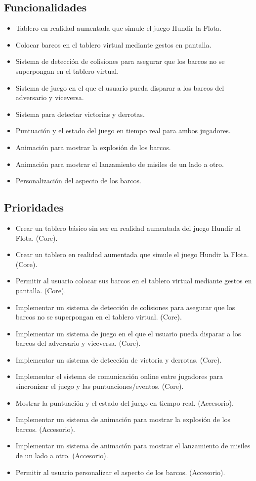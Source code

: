 \documentclass[a4paper, openright, 12pt]{article}
\begin{document}
\subsection{Funcionalidades}
\begin{itemize}
    \item Tablero en realidad aumentada que simule el juego Hundir la Flota.
    \item Colocar barcos en el tablero virtual mediante gestos en pantalla.
    \item Sistema de detección de colisiones para asegurar que los barcos no se superpongan en el tablero virtual.
    \item Sistema de juego en el que el usuario pueda disparar a los barcos del adversario y viceversa.
    \item Sistema para detectar victorias y derrotas.
    \item Puntuación y el estado del juego en tiempo real para ambos jugadores.
    \item Animación para mostrar la explosión de los barcos.
    \item Animación para mostrar el lanzamiento de misiles de un lado a otro.
    \item Personalización del aspecto de los barcos.
\end{itemize}
\subsection{Prioridades}
\begin{itemize}
    \item Crear un tablero básico sin ser en realidad aumentada del juego Hundir al Flota. (Core).
    \item Crear un tablero en realidad aumentada que simule el juego Hundir la Flota. (Core).
    \item Permitir al usuario colocar sus barcos en el tablero virtual mediante gestos en pantalla. (Core).
    \item Implementar un sistema de detección de colisiones para asegurar que los barcos no se superpongan en el tablero virtual. (Core).
    \item Implementar un sistema de juego en el que el usuario pueda disparar a los barcos del adversario y viceversa. (Core).
    \item Implementar un sistema de detección de victoria y derrotas. (Core).
    \item Implementar el sistema de comunicación online entre jugadores para sincronizar el juego y las puntuaciones/eventos. (Core).
    \item Mostrar la puntuación y el estado del juego en tiempo real. (Accesorio).
    \item Implementar un sistema de animación para mostrar la explosión de los barcos. (Accesorio).
    \item Implementar un sistema de animación para mostrar el lanzamiento de misiles de un lado a otro. (Accesorio).
    \item Permitir al usuario personalizar el aspecto de los barcos. (Accesorio).
\end{itemize}
\end{document}

